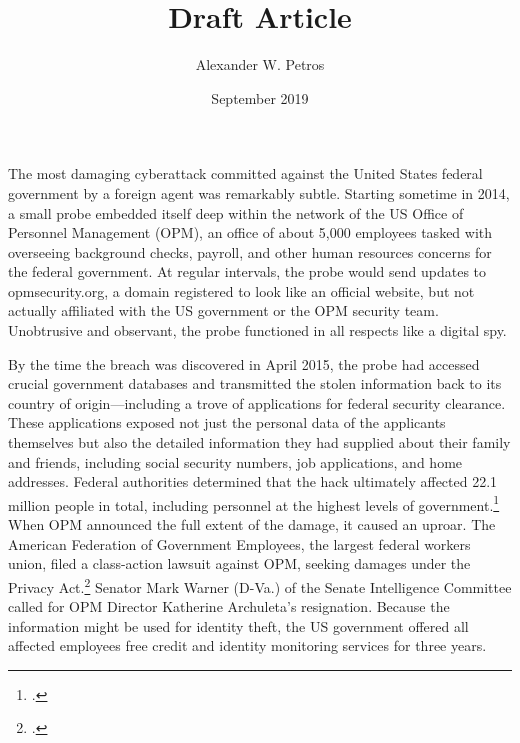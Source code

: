 \documentclass[14pt]{extarticle}
\title{Draft Article}
\author{Alexander W. Petros}
\date{September 2019}
\begin{document}
\maketitle

The most damaging cyberattack committed against the United States federal government by a foreign agent was remarkably subtle. Starting sometime in 2014, a small probe embedded itself deep within the network of the US Office of Personnel Management (OPM), an office of about 5,000 employees tasked with overseeing background checks, payroll, and other human resources concerns for the federal government. At regular intervals, the probe would send updates to opmsecurity.org, a domain registered to look like an official website, but not actually affiliated with the US government or the OPM security team. Unobtrusive and observant, the probe functioned in all respects like a digital spy.

By the time the breach was discovered in April 2015, the probe had accessed crucial government databases and transmitted the stolen information back to its country of origin---including a trove of applications for federal security clearance. These applications exposed not just the personal data of the applicants themselves but also the detailed information they had supplied about their family and friends, including social security numbers, job applications, and home addresses. Federal authorities determined that the hack ultimately affected 22.1 million people in total, including personnel at the highest levels of government.\footcite{nakashima_hacks_2015} When OPM announced the full extent of the damage, it caused an uproar. The American Federation of Government Employees, the largest federal workers union, filed a class-action lawsuit against OPM, seeking damages under the Privacy Act.\footcite{chalfant_court_2017} Senator Mark Warner (D-Va.) of the Senate Intelligence Committee called for OPM Director Katherine Archuleta's resignation. Because the information might be used for identity theft, the US government offered all affected employees free credit and identity monitoring services for three years.
\end{document}
